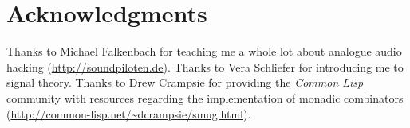 \section{Acknowledgments}

Thanks to Michael Falkenbach for teaching me a whole lot about analogue
audio hacking (\url{http://soundpiloten.de}). Thanks to Vera Schliefer
for introducing me to signal theory. Thanks to Drew Crampsie for
providing the \textit{Common Lisp} community with resources regarding the
implementation of monadic combinators
(\url{http://common-lisp.net/~dcrampsie/smug.html}).
